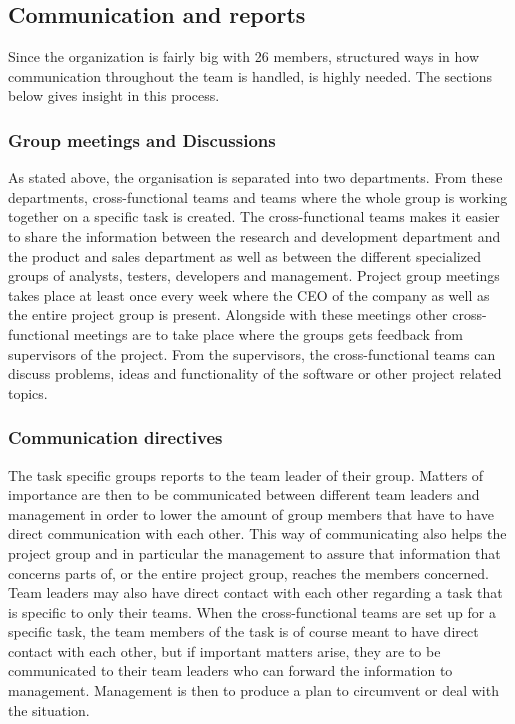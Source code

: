 \subsection{Communication and reports}
Since the organization is fairly big with 26 members,  structured ways in how communication throughout the team is handled, is highly needed. The sections below gives insight in this process. 
\subsubsection{Group meetings and Discussions}
As stated above, the organisation is separated into two departments. From these departments, cross-functional teams and teams where the whole group is working together on a specific task is created. The cross-functional teams makes it easier to share the information between the research and development department and the product and sales department as well as between the different specialized groups of analysts, testers, developers and management. Project group meetings takes place at least once every week where the CEO of the company as well as the entire project group is present. Alongside with these meetings other cross-functional meetings are to take place where the groups gets feedback from supervisors of the project. From the supervisors, the cross-functional teams can discuss problems, ideas and functionality of the software or other project related topics. 

\subsubsection{Communication directives}
The task specific groups reports to the team leader of their group. Matters of importance are then to be communicated between different team leaders and management in order to lower the amount of group members that have to have direct communication with each other. This way of communicating also helps the project group and in particular the management to assure that information that concerns parts of, or the entire project group, reaches the members concerned. Team leaders may also have direct contact with each other regarding a task that is specific to only their teams. When the cross-functional teams are set up for a specific task, the team members of the task is of course meant to have direct contact with each other, but if important matters arise, they are to be communicated to their team leaders who can forward the information to management. Management is then to produce a plan to circumvent or deal with the situation. 

